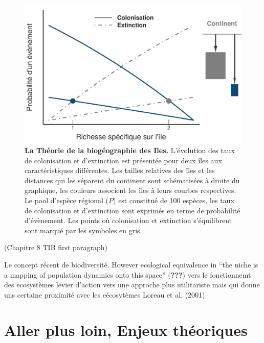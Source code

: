 \begin{figure}[htbp]
\centering
\includegraphics{fig/fig1.pdf}
\caption{\textbf{La Théorie de la biogéographie des Iles.} L'évolution
des taux de colonisation et d'extinction est présentée pour deux îles
aux caractéristiques différentes. Les tailles relatives des îles et les
distances qui les séparent du continent sont schématisées à droite du
graphique, les couleurs associent les îles à leurs courbes respectives.
Le pool d'espèce régional (\(P\)) est constitué de 100 espèces, les taux
de colonisation et d'extinction sont exprimés en terme de probabilité
d'évènement. Les points où colonisation et extinction s'équilibrent sont
marqué par les symboles en gris.\label{fig:figMW}}
\end{figure}

(Chapitre 8 TIB first paragraph)

Le concept récent de biodiversité. However ecological equivalence in
``the niche is a mapping of population dynamics onto this space''
({\textbf{???}}) vers le fonctionnemt des ecosystèmes levier d'action
vers une approche plus utilitariste mais qui donne uns certaine
proximité avec les eécosytèmes Loreau et al. (2001)

\section{Aller plus loin, Enjeux
théoriques}\label{aller-plus-loin-enjeux-thuxe9oriques}

